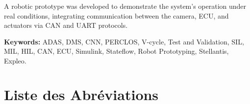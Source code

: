 \documentclass[12pt,a4paper,twoside]{report}
\begin{document}
A robotic prototype was developed to demonstrate the system's operation under real conditions, integrating communication between the camera, ECU, and actuators via CAN and UART protocols.

\vspace{0.5cm}

\noindent\textbf{Keywords:} ADAS, DMS, CNN, PERCLOS, V-cycle, Test and Validation, SIL, MIL, HIL, CAN, ECU, Simulink, Stateflow, Robot Prototyping, Stellantis, Expleo.


\tableofcontents
\listoffigures
\listoftables
\listofalgorithms
{}


\chapter*{Liste des Abréviations}

\vspace{0.5cm}
\end{document}
